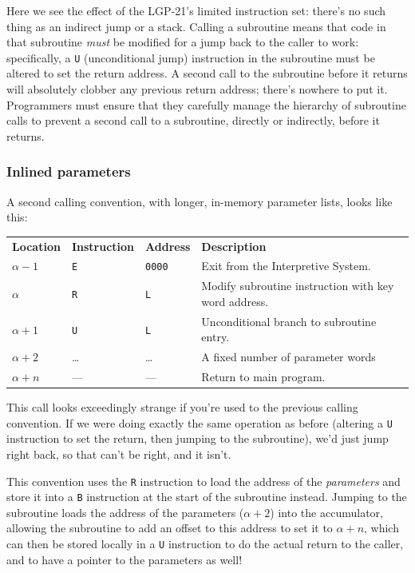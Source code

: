 Here we see the effect of the LGP-21's limited instruction set: there's no such thing as an indirect jump or a stack. Calling a subroutine means that code in that subroutine \emph{must} be modified for a jump back to the caller to work: specifically, a \texttt{U} (unconditional jump) instruction in the subroutine must be altered to set the return address. A second call to the subroutine before it returns will absolutely clobber any previous return address; there's nowhere to put it. Programmers must ensure that they carefully manage the hierarchy of subroutine calls to prevent a second call to a subroutine, directly or indirectly, before it returns.

\subsubsection*{Inlined parameters}
\label{subsec:standard-call2}
A second calling convention, with longer, in-memory parameter lists, looks like this:
\begin{center}
\begin{tabularx}{\textwidth}{lllX}
\textbf{Location} & \textbf{Instruction} & \textbf{Address} & \textbf{Description} \\
$\alpha - 1$      & \texttt{E}            & \texttt{0000}    & Exit from the Interpretive System. \\
$\alpha$          & \texttt{R}            & \texttt{L}       & Modify subroutine instruction with key word address. \\
$\alpha + 1$      & \texttt{U}            & \texttt{L}       & Unconditional branch to subroutine entry. \\
$\alpha + 2$      & \dots                 & \dots            & A fixed number of parameter words \\
$\alpha + n$      & ---                   & ---              & Return to main program. \\
\end{tabularx}
\end{center}
\noindent
This call looks exceedingly strange if you're used to the previous calling convention. If we were doing exactly the same operation as before (altering a \texttt{U} instruction to set the return, then jumping to the subroutine), we'd just jump right back, so that can't be right, and it isn't.

This convention uses the \texttt{R} instruction to load the address of the \emph{parameters} and store it into a \texttt{B} instruction at the start of the subroutine instead. Jumping to the subroutine loads the address of the parameters ($\alpha+2$) into the accumulator, allowing the subroutine to add an offset to this address to set it to $\alpha+n$, which can then be stored locally in a \texttt{U} instruction to do the actual return to the caller, and to have a pointer to the parameters as well!

